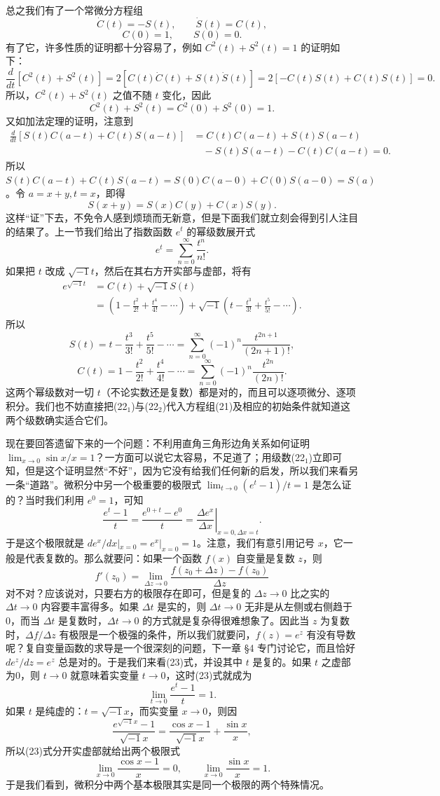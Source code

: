 总之我们有了一个常微分方程组
\[
\dot C(t)=-S(t),\qquad \dot S(t)=C(t),
\]
\[
C(0)=1,\qquad S(0)=0. \tag{21}
\]
有了它，许多性质的证明都十分容易了，例如 $C^2(t)+S^2(t)=1$ 的证明如下：
\[
\frac d{dt}[C^2(t)+S^2(t)]=2[C(t)\dot C(t)+S(t)\dot S(t)]
=2[-C(t)S(t)+C(t)S(t)]=0.
\]
所以，$C^2(t)+S^2(t)$ 之值不随 $t$ 变化，因此
\[
C^2(t)+S^2(t)=C^2(0)+S^2(0)=1.
\]
又如加法定理的证明，注意到
\[
\begin{aligned}
\frac d{dt}[S(t)C(a-t)+C(t)S(a-t)]
&=C(t)C(a-t)+S(t)S(a-t)\\
&\quad-S(t)S(a-t)-C(t)C(a-t)=0.
\end{aligned}
\]
所以 $S(t)C(a-t)+C(t)S(a-t)=S(0)C(a-0)+C(0)S(a-0)=S(a)$。令 $a=x+y,t=x$，即得
\[
S(x+y)=S(x)C(y)+C(x)S(y).
\]
这样“证”下去，不免令人感到烦琐而无新意，但是下面我们就立刻会得到引人注目的结果了。上一节我们给出了指数函数 $e^t$ 的幂级数展开式
\[
e^t=\sum_{n=0}^{\infty}\frac{t^n}{n!}.
\]
如果把 $t$ 改成 $\sqrt{-1}t$，然后在其右方开实部与虚部，将有
\[
\begin{aligned}
e^{\sqrt{-1}t}&=C(t)+\sqrt{-1}S(t)\\
&=\left(1-\frac{t^2}{2!}+\frac{t^4}{4!}-\cdots\right)
+\sqrt{-1}\left(t-\frac{t^3}{3!}+\frac{t^5}{5!}-\cdots\right).
\end{aligned}
\]
所以
\[
S(t)=t-\frac{t^3}{3!}+\frac{t^5}{5!}-\cdots
=\sum_{n=0}^{\infty}(-1)^n\frac{t^{2n+1}}{(2n+1)!}, \tag{22$_1$}
\]
\[
C(t)=1-\frac{t^2}{2!}+\frac{t^4}{4!}-\cdots
=\sum_{n=0}^{\infty}(-1)^n\frac{t^{2n}}{(2n)!}. \tag{22$_2$}
\]
这两个幂级数对一切 $t$（不论实数还是复数）都是对的，而且可以逐项微分、逐项积分。我们也不妨直接把(22$_1$)与(22$_2$)代入方程组(21)及相应的初始条件就知道这两个级数确实适合它们。

现在要回答遗留下来的一个问题：不利用直角三角形边角关系如何证明 $\lim_{x\to0}\sin x/x=1$？一方面可以说它太容易，不足道了；用级数(22$_1$)立即可知，但是这个证明显然“不好”，因为它没有给我们任何新的启发，所以我们来看另一条“道路”。微积分中另一个极重要的极限式 $\lim_{t\to0}(e^t-1)/t=1$ 是怎么证的？当时我们利用 $e^0=1$，可知
\[
\frac{e^t-1}{t}=\frac{e^{0+t}-e^0}{t}=\left.\frac{\Delta e^x}{\Delta x}\right|_{x=0,\Delta x=t}. \tag{23}
\]
于是这个极限就是 $de^x/dx|_{x=0}=e^x|_{x=0}=1$。注意，我们有意引用记号 $x$，它一般是代表复数的。那么就要问：如果一个函数 $f(x)$ 自变量是复数 $z$，则
\[
f'(z_0)=\lim_{\Delta z\to0}\frac{f(z_0+\Delta z)-f(z_0)}{\Delta z}
\]
对不对？应该说对，只要右方的极限存在即可，但是复的 $\Delta z\to0$ 比之实的 $\Delta t\to0$ 内容要丰富得多。如果 $\Delta t$ 是实的，则 $\Delta t\to0$ 无非是从左侧或右侧趋于0，而当 $\Delta t$ 是复数时，$\Delta t\to0$ 的方式就是复杂得很难想象了。因此当 $z$ 为复数时，$\Delta f/\Delta z$ 有极限是一个极强的条件，所以我们就要问，$f(z)=e^z$ 有没有导数呢？复自变量函数的求导是一个很深刻的问题，下一章 §4 专门讨论它，而且恰好 $de^z/dz=e^z$ 总是对的。于是我们来看(23)式，并设其中 $t$ 是复的。如果 $t$ 之虚部为0，则 $t\to0$ 就意味着实变量 $t\to0$，这时(23)式就成为
\[
\lim_{t\to0}\frac{e^t-1}{t}=1.
\]
如果 $t$ 是纯虚的：$t=\sqrt{-1}x$，而实变量 $x\to0$，则因
\[
\frac{e^{\sqrt{-1}x}-1}{\sqrt{-1}x}=\frac{\cos x-1}{\sqrt{-1}x}+\frac{\sin x}{x},
\]
所以(23)式分开实虚部就给出两个极限式
\[
\lim_{x\to0}\frac{\cos x-1}{x}=0,
\qquad
\lim_{x\to0}\frac{\sin x}{x}=1.
\]
于是我们看到，微积分中两个基本极限其实是同一个极限的两个特殊情况。

